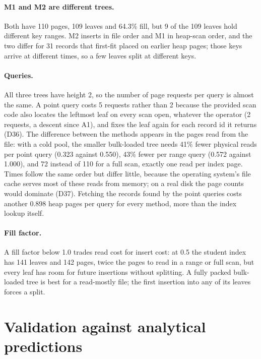 \documentclass[11pt,a4paper]{article}
\begin{document}
\paragraph{M1 and M2 are different trees.} Both have 110 pages, 109 leaves and 64.3\% fill, but 9 of the 109 leaves hold different key ranges. M2 inserts in file order and M1 in heap-scan order, and the two differ for 31 records that first-fit placed on earlier heap pages; those keys arrive at different times, so a few leaves split at different keys.

\paragraph{Queries.} All three trees have height 2, so the number of page requests per query is almost the same. A point query costs 5 requests rather than 2 because the provided scan code also locates the leftmost leaf on every scan open, whatever the operator (2 requests, a descent since A1), and fixes the leaf again for each record id it returns (D36). The difference between the methods appears in the pages read from the file: with a cold pool, the smaller bulk-loaded tree needs 41\% fewer physical reads per point query (0.323 against 0.550), 43\% fewer per range query (0.572 against 1.000), and 72 instead of 110 for a full scan, exactly one read per index page. Times follow the same order but differ little, because the operating system's file cache serves most of these reads from memory; on a real disk the page counts would dominate (D37). Fetching the records found by the point queries costs another 0.898 heap pages per query for every method, more than the index lookup itself.

\paragraph{Fill factor.} A fill factor below 1.0 trades read cost for insert cost: at 0.5 the student index has 141 leaves and 142 pages, twice the pages to read in a range or full scan, but every leaf has room for future insertions without splitting. A fully packed bulk-loaded tree is best for a read-mostly file; the first insertion into any of its leaves forces a split.

\section{Validation against analytical predictions}
\label{sec:validation}
\end{document}
